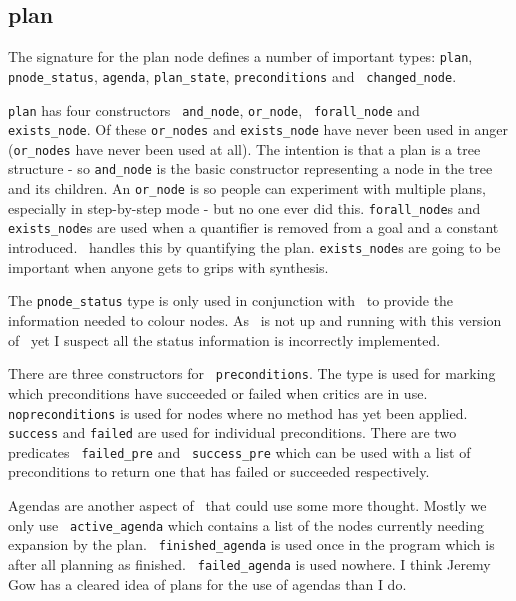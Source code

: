 \subsection{plan}
The signature for the plan node defines a number of important types:
{\tt plan}, {\tt pnode\_status}, 
{\tt agenda}, {\tt plan\_state}, 
{\tt preconditions} and {\tt
  changed\_node}.  

{\tt plan} has four constructors {\tt
  and\_node}, {\tt or\_node}, {\tt
  forall\_node} and {\tt
  exists\_node}.  Of these {\tt or\_nodes} and
{\tt exists\_node} have never been used in anger ({\tt or\_nodes} have
never been used at all).  The intention is that a plan is a tree
structure - so {\tt and\_node} is the basic constructor representing a
node in the tree and its children.  An {\tt or\_node} is so people can
experiment with multiple plans, especially in
step-by-step mode - but no one ever did this.
{\tt forall\_node}s and {\tt exists\_node}s are used when a quantifier
is removed from a goal and a constant introduced.  \lprolog\ handles
this by quantifying the plan.  {\tt exists\_node}s are going to be
important when anyone gets to grips with synthesis.

The {\tt pnode\_status} type is only used in
conjunction with \xlclam\ to provide the information needed to colour
nodes.  As \xlclam\ is not up and running with this version of \lclam\ 
yet I suspect all the status information is incorrectly implemented.

There are three constructors for {\tt
  preconditions}.  The type is used for marking
which preconditions have succeeded or failed when
critics are in use.  {\tt
  nopreconditions} is used for nodes where no
method\index{method} has yet been applied.  {\tt
  success} and {\tt failed} are used for
individual preconditions.  There are two predicates {\tt
  failed\_pre} and {\tt
  success\_pre} which can be used with a list of
preconditions to return one that has failed or succeeded respectively.

Agendas are another aspect of \lclam\ that could use
some more thought.  Mostly we only use {\tt
  active\_agenda} which contains a list of the
nodes currently needing expansion by the plan. {\tt
  finished\_agenda} is used once in the
program which is after all planning as finished.  {\tt
  failed\_agenda} is used nowhere.  I think
Jeremy Gow has a cleared idea of plans for the use of agendas than I
do.


